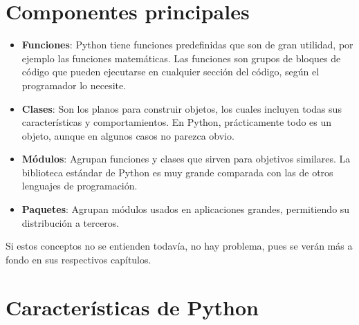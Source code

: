\section{Componentes principales}

\begin{itemize}
  \item \textbf{Funciones}: Python tiene funciones predefinidas que son de gran utilidad, por ejemplo las funciones matemáticas.
Las funciones son grupos de bloques de código que pueden ejecutarse en cualquier sección del código, según el programador lo necesite.
  
  \item \textbf{Clases}: Son los planos para construir objetos, los cuales incluyen todas sus características y comportamientos.
En Python, prácticamente todo es un objeto, aunque en algunos casos no parezca obvio.
  
  \item \textbf{Módulos}: Agrupan funciones y clases que sirven para objetivos similares.
La biblioteca estándar de Python es muy grande comparada con las de otros lenguajes de programación.
  
  \item \textbf{Paquetes}: Agrupan módulos usados en aplicaciones grandes, permitiendo su distribución a terceros.
  
\end{itemize}

Si estos conceptos no se entienden todavía, no hay problema, pues se verán más a fondo en sus respectivos capítulos.

\section{Características de Python}

